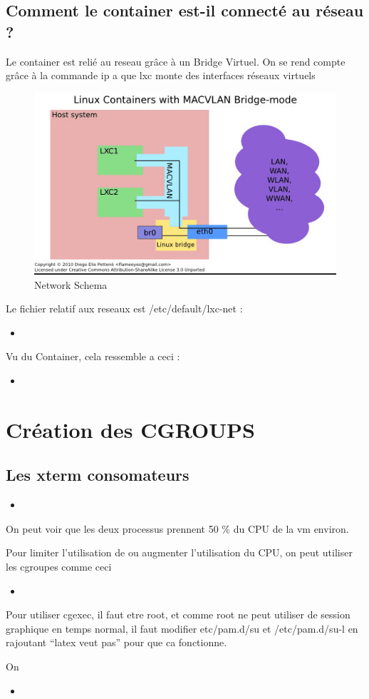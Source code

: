\documentclass[10pt,a4paper]{article}
\newcommand{\insertcode}[2]{\begin{itemize}\item[]\end{itemize}}
\begin{document}
\subsection{Comment le container est-il connecté au réseau ? }
Le container est relié au reseau grâce à un Bridge Virtuel.
On se rend compte grâce à la commande ip a que lxc monte des interfaces réseaux virtuels 
  \begin{figure}[h!]
\centering
\includegraphics[scale=0.50]{screen/1.jpg}
\caption{Network Schema}
\label{fig:net }
\end{figure}
Le fichier relatif aux reseaux est /etc/default/lxc-net :
\insertcode{commande/8.txt}{lxc-net default}

Vu du Container, cela ressemble a ceci : 
\insertcode{commande/9.txt}{Configuration Réseau  }

\section{Création des CGROUPS }

\subsection{Les xterm consomateurs }
\insertcode{commande/10.txt}{top}
On peut voir que les deux processus prennent 50 \%  du CPU de la vm environ.

Pour limiter l'utilisation de ou augmenter l'utilisation du CPU, on peut utiliser les cgroupes comme ceci 
\insertcode{commande/11.txt}{Cgroupe set}
Pour utiliser cgexec,  il faut etre root, et comme root ne peut utiliser de session graphique en temps normal, il faut modifier etc/pam.d/su et /etc/pam.d/su-l en rajoutant ``latex veut pas''  pour que ca fonctionne.


On

\insertcode{commande/12.txt}{top}
\end{document}
